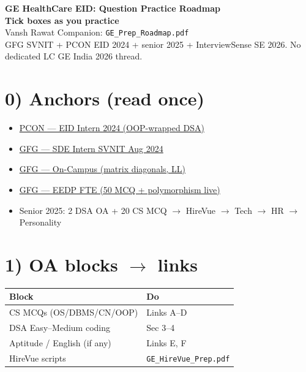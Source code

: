 \documentclass[a4paper,9pt]{extarticle}
\begin{document}
\begin{center}
  {\LARGE\textbf{GE HealthCare EID: Question Practice Roadmap}}\\[0.5pt]
  {\small\color{hot}\textbf{Tick boxes as you practice}}\\[1pt]
  {\small Vansh Rawat \textbar{} Companion: \texttt{GE\_Prep\_Roadmap.pdf}}\\[0.5pt]
  {\footnotesize\color{muted}
  GFG SVNIT + PCON EID 2024 + senior 2025 + InterviewSense SE 2026. No dedicated LC GE India 2026 thread.}
\end{center}

\section{0) Anchors (read once)}
\begin{itemize}
  \item \href{https://pcon-app.vercel.app/blogs/cltfdffwe0003k1a1zpsw2i5g}{PCON --- EID Intern 2024 (OOP-wrapped DSA)}
  \item \href{https://www.geeksforgeeks.org/interview-experiences/ge-healthcare-interview-experience-sde-internship-on-campus/}{GFG --- SDE Intern SVNIT Aug 2024}
  \item \href{https://www.geeksforgeeks.org/interview-experiences/ge-healthcare-interview-experience-on-campus-3/}{GFG --- On-Campus (matrix diagonals, LL)}
  \item \href{https://www.geeksforgeeks.org/interview-experiences/ge-healthcare-interview-experience-for-fte-eedp-on-campus/}{GFG --- EEDP FTE (50 MCQ + polymorphism live)}
  \item Senior 2025: 2 DSA OA + 20 CS MCQ $\rightarrow$ HireVue $\rightarrow$ Tech $\rightarrow$ HR $\rightarrow$ Personality
\end{itemize}

\section{1) OA blocks $\to$ links}
\noindent\begin{tabularx}{\textwidth}{@{}l X@{}}
\textbf{Block} & \textbf{Do} \\
\hline
CS MCQs (OS/DBMS/CN/OOP) & Links A--D \\
DSA Easy--Medium coding & Sec 3--4 \\
Aptitude / English (if any) & Links E, F \\
HireVue scripts & \texttt{GE\_HireVue\_Prep.pdf} \\
\end{tabularx}
\end{document}
